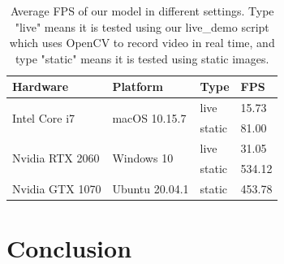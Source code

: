 \documentclass[10pt,twocolumn,letterpaper]{article}
\begin{document}
\begin{table}[h]
\begin{center}
\begin{tabular}{|l|l|l|l|}
\hline
Hardware              & Platform                & Type   & FPS \\ \hline\hline
\multirow{2}{*}{Intel Core i7}   & \multirow{2}{*}{macOS 10.15.7}  & live   & 15.73  \\ \cline{3-4} 
                      &                         & static & 81.00  \\ \hline
\multirow{2}{*}{Nvidia RTX 2060} & \multirow{2}{*}{Windows 10} & live   & 31.05  \\ \cline{3-4} 
                      &                         & static & 534.12 \\ \hline
Nvidia GTX 1070 & Ubuntu 20.04.1 & static & 453.78 \\ \hline                    
\end{tabular}
\end{center}
\caption{Average FPS of our model in different settings. Type "live" means it is tested using our live\_demo script which uses OpenCV to record video in real time, and type "static" means it is tested using static images.}
\label{table:fps}
\end{table}


\section{Conclusion}
\blindtext



{\small


}
\end{document}
